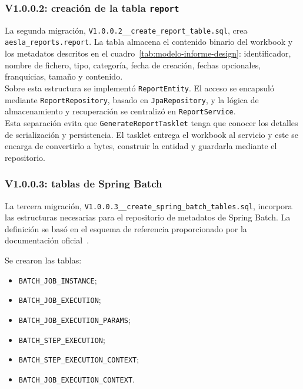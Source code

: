 \documentclass[11pt,a4paper,titlepage,oneside]{report}
\begin{document}
\subsubsection{V1.0.0.2: creación de la tabla \texttt{report}}

La segunda migración,
\texttt{V1.0.0.2\_\_create\_report\_table.sql}, crea
\texttt{aesla\_reports.report}. La tabla almacena el contenido binario del
workbook y los metadatos descritos en el
cuadro~\ref{tab:modelo-informe-design}: identificador, nombre de fichero,
tipo, categoría, fecha de creación, fechas opcionales, franquicias, tamaño y
contenido. \\

Sobre esta estructura se implementó \texttt{ReportEntity}. El acceso se
encapsuló mediante \texttt{ReportRepository}, basado en
\texttt{JpaRepository}, y la lógica de almacenamiento y recuperación se
centralizó en \texttt{ReportService}. \\

Esta separación evita que \texttt{GenerateReportTasklet} tenga que conocer los
detalles de serialización y persistencia. El tasklet entrega el workbook al
servicio y este se encarga de convertirlo a bytes, construir la entidad y
guardarla mediante el repositorio. 

\subsubsection{V1.0.0.3: tablas de Spring Batch}

La tercera migración,
\texttt{V1.0.0.3\_\_create\_spring\_batch\_tables.sql}, incorpora las
estructuras necesarias para el repositorio de metadatos de Spring Batch. La
definición se basó en el esquema de referencia proporcionado por la
documentación oficial~\cite{SpringBatchSchemaDocs}.

Se crearon las tablas:

\begin{itemize}
  \item \texttt{BATCH\_JOB\_INSTANCE};
  \item \texttt{BATCH\_JOB\_EXECUTION};
  \item \texttt{BATCH\_JOB\_EXECUTION\_PARAMS};
  \item \texttt{BATCH\_STEP\_EXECUTION};
  \item \texttt{BATCH\_STEP\_EXECUTION\_CONTEXT};
  \item \texttt{BATCH\_JOB\_EXECUTION\_CONTEXT}.
\end{itemize}
\end{document}
